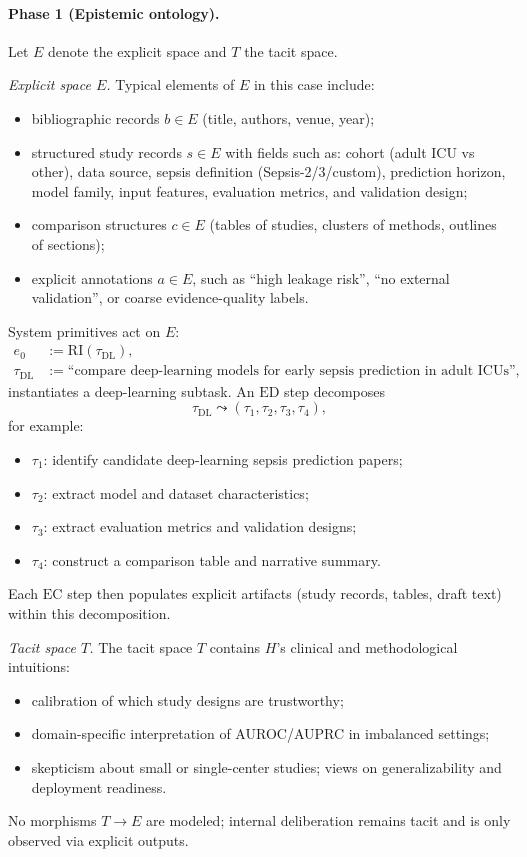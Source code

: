 \paragraph{Phase 1 (Epistemic ontology).}
Let \(E\) denote the explicit space and \(T\) the tacit space.

\emph{Explicit space \(E\).}
Typical elements of \(E\) in this case include:
\begin{itemize}
  \item bibliographic records \(b \in E\) (title, authors, venue, year);
  \item structured study records \(s \in E\) with fields such as: cohort (adult ICU vs other), data source, sepsis definition (Sepsis-2/3/custom), prediction horizon, model family, input features, evaluation metrics, and validation design;
  \item comparison structures \(c \in E\) (tables of studies, clusters of methods, outlines of sections);
  \item explicit annotations \(a \in E\), such as ``high leakage risk'', ``no external validation'', or coarse evidence-quality labels.
\end{itemize}
System primitives act on \(E\):
\begin{align*}
  e_0 &:= \mathrm{RI}(\tau_{\mathrm{DL}}), \\
  \tau_{\mathrm{DL}} &:= \text{``compare deep-learning models for early sepsis prediction in adult ICUs''},
\end{align*}
instantiates a deep-learning subtask. An \(\mathrm{ED}\) step decomposes
\[
  \tau_{\mathrm{DL}} \leadsto (\tau_1,\tau_2,\tau_3,\tau_4),
\]
for example:
\begin{itemize}
  \item \(\tau_1\): identify candidate deep-learning sepsis prediction papers;
  \item \(\tau_2\): extract model and dataset characteristics;
  \item \(\tau_3\): extract evaluation metrics and validation designs;
  \item \(\tau_4\): construct a comparison table and narrative summary.
\end{itemize}
Each \(\mathrm{EC}\) step then populates explicit artifacts (study records, tables, draft text) within this decomposition.

\emph{Tacit space \(T\).}
The tacit space \(T\) contains \(H\)'s clinical and methodological intuitions:
\begin{itemize}
  \item calibration of which study designs are trustworthy;
  \item domain-specific interpretation of AUROC/AUPRC in imbalanced settings;
  \item skepticism about small or single-center studies; views on generalizability and deployment readiness.
\end{itemize}
No morphisms \(T \to E\) are modeled; internal deliberation remains tacit and is only observed via explicit outputs.

